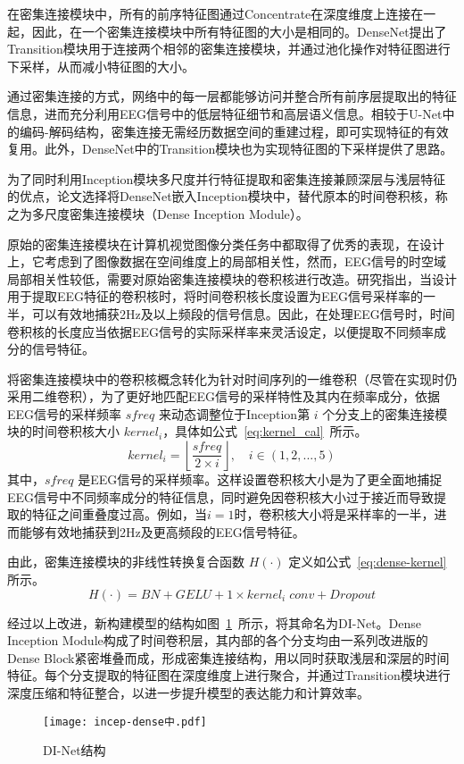 在密集连接模块中，所有的前序特征图通过Concentrate在深度维度上连接在一起，因此，在一个密集连接模块中所有特征图的大小是相同的。DenseNet提出了Transition模块用于连接两个相邻的密集连接模块，并通过池化操作对特征图进行下采样，从而减小特征图的大小。

通过密集连接的方式，网络中的每一层都能够访问并整合所有前序层提取出的特征信息，进而充分利用EEG信号中的低层特征细节和高层语义信息。相较于U-Net中的编码-解码结构，密集连接无需经历数据空间的重建过程，即可实现特征的有效复用。此外，DenseNet中的Transition模块也为实现特征图的下采样提供了思路。

为了同时利用Inception模块多尺度并行特征提取和密集连接兼顾深层与浅层特征的优点，论文选择将DenseNet嵌入Inception模块中，替代原本的时间卷积核，称之为多尺度密集连接模块（Dense Inception Module）。

原始的密集连接模块在计算机视觉图像分类任务中都取得了优秀的表现，在设计上，它考虑到了图像数据在空间维度上的局部相关性，然而，EEG信号的时空域局部相关性较低，需要对原始密集连接模块的卷积核进行改造。研究指出\cite{lawhern2018eegnet}，当设计用于提取EEG特征的卷积核时，将时间卷积核长度设置为EEG信号采样率的一半，可以有效地捕获2Hz及以上频段的信号信息。因此，在处理EEG信号时，时间卷积核的长度应当依据EEG信号的实际采样率来灵活设定，以便提取不同频率成分的信号特征。

将密集连接模块中的卷积核概念转化为针对时间序列的一维卷积（尽管在实现时仍采用二维卷积），为了更好地匹配EEG信号的采样特性及其内在频率成分，依据EEG信号的采样频率 \(sfreq\) 来动态调整位于Inception第 \(i\) 个分支上的密集连接模块的时间卷积核大小 \(kernel_i\)，具体如公式~\ref{eq:kernel_cal}~所示。
\begin{equation}
    kernel_i = \left \lfloor \frac{sfreq}{2 \times i} \right \rfloor , \quad i \in (1,2,...,5)
    \label{eq:kernel_cal}
\end{equation}
其中，\(sfreq\) 是EEG信号的采样频率。这样设置卷积核大小是为了更全面地捕捉EEG信号中不同频率成分的特征信息，同时避免因卷积核大小过于接近而导致提取的特征之间重叠度过高。例如，当\(i=1\)时，卷积核大小将是采样率的一半，进而能够有效地捕获到2Hz及更高频段的EEG信号特征。

由此，密集连接模块的非线性转换复合函数 \(H(·)\) 定义如公式~\ref{eq:dense-kernel}所示。
\begin{equation}\label{eq:dense-kernel}
    H(·) = BN + GELU + 1 \times kernel_i\;conv + Dropout 
\end{equation}

经过以上改进，新构建模型的结构如图~\ref{fig:incep-dense}~所示，将其命名为DI-Net。Dense Inception Module构成了时间卷积层，其内部的各个分支均由一系列改进版的Dense Block紧密堆叠而成，形成密集连接结构，用以同时获取浅层和深层的时间特征。每个分支提取的特征图在深度维度上进行聚合，并通过Transition模块进行深度压缩和特征整合，以进一步提升模型的表达能力和计算效率。
\begin{figure}[ht]
  \centering
  \texttt{[image: incep-dense中.pdf]}
  \caption{DI-Net结构}
  \label{fig:incep-dense}
\end{figure}

